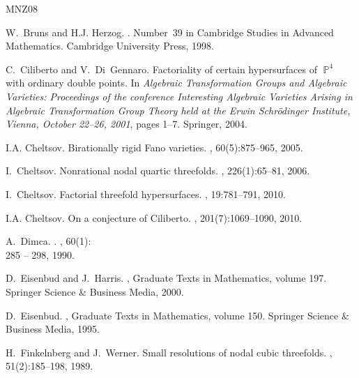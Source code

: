 \documentclass[a4paper,11pt,english,german]{amsart}
\DeclareMathOperator{\IP}{\mathbb{P}}
\theoremstyle{definition}
\begin{document}

\begin{thebibliography}{MNZ08}

W.~Bruns and H.J. Herzog.
.
\newblock Number~39 in Cambridge Studies in Advanced Mathematics. Cambridge University Press, 1998.

C.~Ciliberto and V.~Di~Gennaro.
\newblock Factoriality of certain hypersurfaces of $\IP^4$ with ordinary double points.
\newblock In {\em Algebraic {T}ransformation {G}roups and {A}lgebraic {V}arieties: {P}roceedings of the conference {I}nteresting {A}lgebraic {V}arieties {A}rising in {A}lgebraic {T}ransformation {G}roup {T}heory held at the {E}rwin {S}chr{\"o}dinger {I}nstitute, {V}ienna, {O}ctober 22--26, 2001}, pages 1--7. Springer, 2004.

I.A. Cheltsov.
\newblock Birationally rigid {F}ano varieties.
, 60(5):875--965, 2005.

I.~Cheltsov.
\newblock Nonrational nodal quartic threefolds.
, 226(1):65--81, 2006.

I.~Cheltsov.
\newblock Factorial threefold hypersurfaces.
, 19:781--791, 2010.

I.A. Cheltsov.
\newblock On a conjecture of {C}iliberto.
, 201(7):1069--1090, 2010.

A.~Dimca.
.
, 60(1):\\285 -- 298, 1990.

D.~Eisenbud and J.~Harris.
, Graduate Texts in Mathematics, volume 197.
\newblock Springer Science \& Business Media, 2000.

D.~Eisenbud.
, Graduate Texts in Mathematics, volume 150.
\newblock Springer Science \& Business Media, 1995.

H.~Finkelnberg and J.~Werner.
\newblock Small resolutions of nodal cubic threefolds.
, 51(2):185--198, 1989.


\end{thebibliography}
\end{document}
